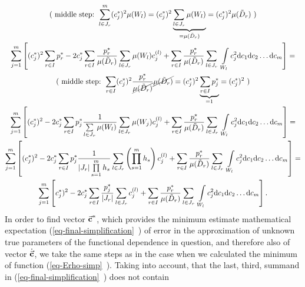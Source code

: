 \begin{gather}
\nonumber
\text{( middle step: } \sum_{l \in J_{r}}^{m}(c_{j}^{*})^{2} \mu(W_{l}) = (c_{j}^{*})^{2} \underbrace{\sum_{l \in J_{r}} \mu(W_{l})}_{=\mu(\tilde{D}_{r})} = (c_{j}^{*})^{2} \mu(\tilde{D}_{r}) \text{ )} \\
\nonumber
\sum\limits_{j=1}^{m} \left[  (c_{j}^{*})^{2}  \sum\limits_{r \in I} p_{r}^{*}  - 2c_{j}^{*}  \sum\limits_{r \in I} \frac{p_{r}^{*}}{\mu(\tilde{D}_{r})} \sum\limits_{l \in J_{r}} \mu(W_{l})  c_{j}^{(l)}  + \sum\limits_{r \in I} \frac{p_{r}^{*}}{\mu(\tilde{D}_{r})} \sum\limits_{l \in J_{r}} \ \int\limits_{W_{l}} c_{j}^{2}  \mathrm{d}c_{1} \mathrm{d}c_{2} \dots \mathrm{d}c_{m} \right] = \\
\nonumber
\text{( middle step: } \sum_{r \in I} (c_{j}^{*})^{2} \frac{p_{r}^{*}}{\cancel{\mu(\tilde{D}_{r})}} \cancel{\mu(\tilde{D}_{r})} = (c_{j}^{*})^{2} \underbrace{\sum_{r \in I} p_{j}^{*}}_{=1} = (c_{j}^{*})^{2} \text{ )}\\
\nonumber
\sum\limits_{j=1}^{m} \left[  (c_{j}^{*})^{2} - 2c_{j}^{*} \sum\limits_{r \in I} p_{j}^{*} \frac{1}{\sum\limits_{l \in J_{r}} \mu(W_{l})} \sum\limits_{l \in J_{r}} \mu(W_{j}) c_{j}^{(l)} +  \sum\limits_{r \in I} \frac{p_{r}^{*}}{\mu(\tilde{D}_{r})} \sum\limits_{l \in J_{r}} \ \int\limits_{W_{l}} c_{j}^{2}  \mathrm{d}c_{1} \mathrm{d}c_{2} \dots \mathrm{d}c_{m} \right] = \\
\nonumber
\sum\limits_{j=1}^{m}  \left[    (c_{j}^{*})^{2} - 2c_{j}^{*} \sum\limits_{r \in I} p_{j}^{*} \frac{1}{\left| J_{r} \right| \prod\limits_{s=1}^{m} h_{s}} \sum\limits_{l \in J_{r}} \left( \prod_{s=1}^{m} h_{s} \right) c_{j}^{(l)} +  \sum\limits_{r \in I} \frac{p_{r}^{*}}{\mu(\tilde{D}_{r})} \sum\limits_{l \in J_{r}} \ \int\limits_{W_{l}} c_{j}^{2}  \mathrm{d}c_{1} \mathrm{d}c_{2} \dots \mathrm{d}c_{m} \right] = \\
\sum\limits_{j=1}^{m} \left[ c_{j}^{*})^{2} - 2c_{j}^{*} \sum\limits_{r \in I} \frac{p_{j}^{*}}{ \left| J_{r} \right|} \sum\limits_{l \in J_{r}} c_{j}^{(l)} + \sum\limits_{r \in I} \frac{p_{r}^{*}}{\mu(\tilde{D}_{r})} \sum\limits_{l \in J_{r}} \ \int\limits_{W_{l}} c_{j}^{2}  \mathrm{d}c_{1} \mathrm{d}c_{2} \dots \mathrm{d}c_{m} \right]. \label{eq-final-simplification}
\end{gather}
In order to find vector $\vec{\textbf{c}}^{*}$, which provides the minimum estimate mathematical expectation (\vref{eq-final-simplification}~) of error in the approximation of unknown true parameters of the functional dependence in question, and therefore also of vector $\dot{\vec{\textbf{c}}}$, we take the same steps as in the case when we calculated the minimum of function (\vref{eq-Erho-simp}~). Taking into account, that the last, third, summand in (\vref{eq-final-simplification}~) does not contain 
